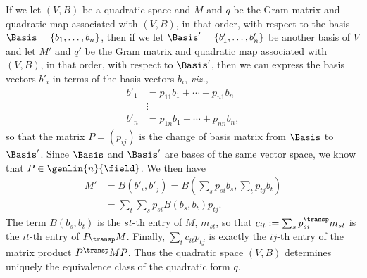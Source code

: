 If we let \((V, B)\) be a quadratic space and \(M\) and \(q\) be the Gram matrix and quadratic map associated with \((V, B)\), in that order, with respect to the basis \(\Basis =\{b_1, \dots, b_n\}\), then if we let \(\Basis' = \{b'_1, \dots, b'_n\}\) be another basis of \(V\) and let \(M'\) and \(q'\) be the Gram matrix and quadratic map associated with \((V, B)\), in that order, with respect to \(\Basis'\), then we can express the basis vectors \(b'_i\) in terms of the basis vectors \(b_i\), \emph{viz.,}\label{sec:quadratic-space-change-of-basis}
\begin{align*}
    b'_1 &= p_{11}b_1 + \cdots + p_{n1}b_n\\
    &\vdots\\
    b'_n &= p_{1n}b_1 + \cdots + p_{nn}b_n,
\end{align*}
so that the matrix \(P = (p_{ij})\) is the change of basis matrix from \(\Basis\) to \(\Basis'\). Since \(\Basis\) and \(\Basis'\) are bases of the same vector space, we know that \(P \in \genlin{n}{\field}\). We then have
\begin{align*}
  M' &= B(b'_i, b'_j) = B\left(\sum_{s} p_{si}b_s, \sum_t p_{tj}b_t\right)\\
  &= \sum_t \sum_s p_{si}B(b_s, b_t)p_{tj}.
\end{align*}
The term \(B(b_s, b_t)\) is the \(st\)-th entry of \(M\), \(m_{st}\), so that \(c_{it} := \sum_s p^{\transp}_{si}m_{st}\) is the \(it\)-th entry of \(P_{\transp}M\). Finally, \(\sum_t c_{it}p_{tj}\) is exactly the \(ij\)-th entry of the matrix product \(P^{\transp}MP\). Thus the quadratic space \((V, B)\) determines uniquely the equivalence class of the quadratic form \(q\).

